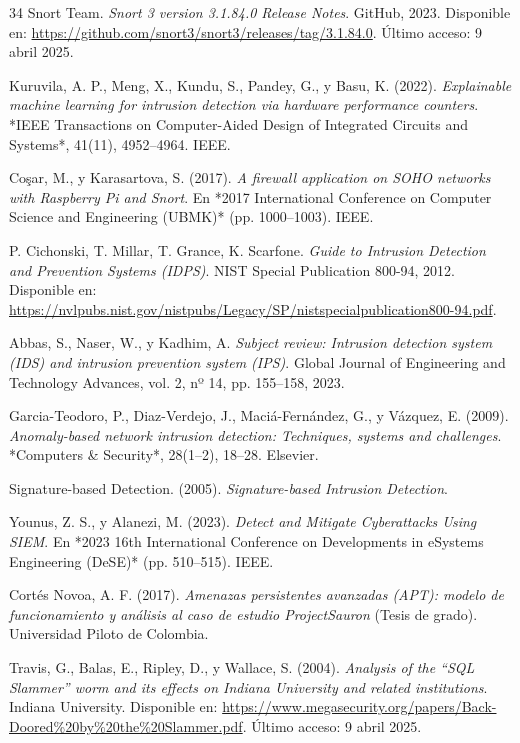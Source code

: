 \documentclass[11pt,a4paper,twoside]{report}
\begin{document}
\begin{thebibliography}{34}
	Snort Team. \textit{Snort 3 version 3.1.84.0 Release Notes}. GitHub, 2023. Disponible en: \url{https://github.com/snort3/snort3/releases/tag/3.1.84.0}. Último acceso: 9 abril 2025.
	
	Kuruvila, A. P., Meng, X., Kundu, S., Pandey, G., y Basu, K. (2022). \textit{Explainable machine learning for intrusion detection via hardware performance counters}. *IEEE Transactions on Computer-Aided Design of Integrated Circuits and Systems*, 41(11), 4952--4964. IEEE.
	
	Coşar, M., y Karasartova, S. (2017). \textit{A firewall application on SOHO networks with Raspberry Pi and Snort}. En *2017 International Conference on Computer Science and Engineering (UBMK)* (pp. 1000--1003). IEEE.
	
	P. Cichonski, T. Millar, T. Grance, K. Scarfone. \textit{Guide to Intrusion Detection and Prevention Systems (IDPS)}. NIST Special Publication 800-94, 2012. Disponible en: \url{https://nvlpubs.nist.gov/nistpubs/Legacy/SP/nistspecialpublication800-94.pdf}.
	
	Abbas, S., Naser, W., y Kadhim, A. \textit{Subject review: Intrusion detection system (IDS) and intrusion prevention system (IPS)}. Global Journal of Engineering and Technology Advances, vol. 2, nº 14, pp. 155–158, 2023.
	
	Garcia-Teodoro, P., Diaz-Verdejo, J., Maciá-Fernández, G., y Vázquez, E. (2009). \textit{Anomaly-based network intrusion detection: Techniques, systems and challenges}. *Computers \& Security*, 28(1–2), 18--28. Elsevier.
	
	
	Signature-based Detection. (2005). \textit{Signature-based Intrusion Detection}.
	
	Younus, Z. S., y Alanezi, M. (2023). \textit{Detect and Mitigate Cyberattacks Using SIEM}. En *2023 16th International Conference on Developments in eSystems Engineering (DeSE)* (pp. 510--515). IEEE.
	
	Cortés Novoa, A. F. (2017). \textit{Amenazas persistentes avanzadas (APT): modelo de funcionamiento y análisis al caso de estudio ProjectSauron} (Tesis de grado). Universidad Piloto de Colombia.
	
	Travis, G., Balas, E., Ripley, D., y Wallace, S. (2004). \textit{Analysis of the “SQL Slammer” worm and its effects on Indiana University and related institutions}. Indiana University. Disponible en: \url{https://www.megasecurity.org/papers/Back-Doored%20by%20the%20Slammer.pdf}. Último acceso: 9 abril 2025.
	

\end{thebibliography}
\end{document}
